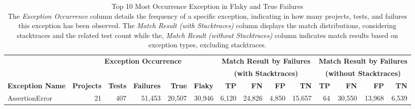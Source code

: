 



\begin{table*}[t]
\caption[Top 10 Most Occurrence Exception in Flaky and True Failures]{Top 10 Most Occurrence Exception in Flaky and True Failures \\ 
\textnormal{ The \textit{Exception Occurrence} column details the frequency of a specific exception, indicating in how many projects, tests, and failures this exception has been observed. The \textit{Match Result (with Stacktraces)} column displays the match distributions, considering stacktraces and the related test count while the, \textit{Match Result (without Stacktraces)} column indicates match results based on exception types, excluding stacktraces.}}

\vspace{-5pt}
\setlength{\tabcolsep}{2.5pt}
\newcommand{\failureRateWidth}{2.5in}
\newcommand{\failureRateHeight}{4em}
\scriptsize
\centering


    \begin{tabular}{l|rrr|rr|rrrr|rrrr}
    \toprule
      & \multicolumn{5}{c|}{\textbf{Exception Occurrence}} & \multicolumn{4}{c|}{\textbf{Match Result by Failures}} & \multicolumn{4}{c}{\textbf{Match Result by Failures}} \\ 

      & \multicolumn{5}{c|}{\textbf{}} & \multicolumn{4}{c|}{\textbf{(with Stacktraces)}}  &\multicolumn{4}{c}{\textbf{(without Stacktraces)}} \\ 
     
     \textbf{Exception Name}&\textbf{Projects}&\textbf{Tests}&\textbf{Failures}&\textbf{True}&\textbf{Flaky}&\textbf{TP}& \textbf{FN}&\textbf{FP}& \textbf{TN}&\textbf{TP}& \textbf{FN}&\textbf{FP}& \textbf{TN}\\
        \midrule
AssertionError&21&407&51,453&20,507&30,946&6,120&24,826&4,850&15,657&64&30,550&13,968&6,539\\


\end{tabular}
\end{table*}
